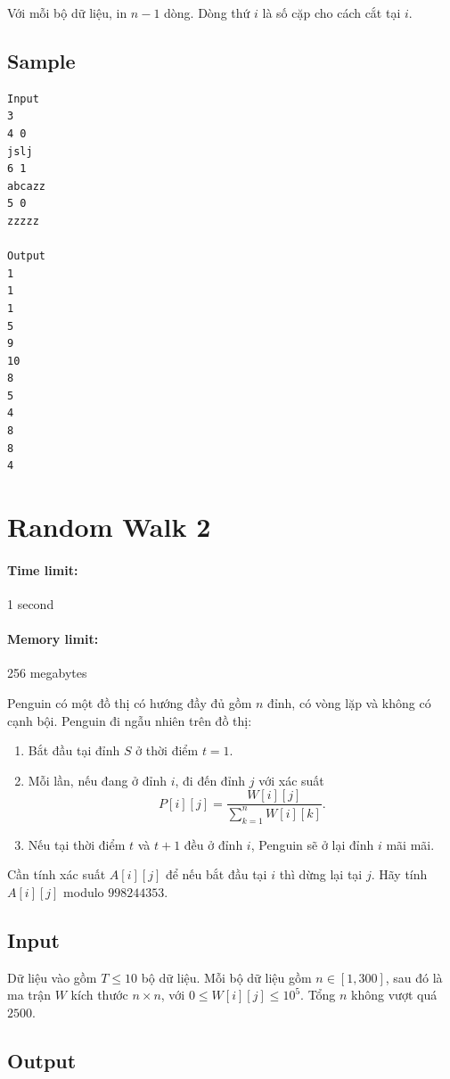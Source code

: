 \documentclass[11pt]{article}
\begin{document}
Với mỗi bộ dữ liệu, in \(n-1\) dòng. Dòng thứ \(i\) là số cặp cho cách cắt tại
\(i\).

\subsection*{Sample}

\begin{verbatim}
Input
3
4 0
jslj
6 1
abcazz
5 0
zzzzz

Output
1
1
1
5
9
10
8
5
4
8
8
4
\end{verbatim}

\section{Random Walk 2}

\paragraph{Time limit:} 1 second
\paragraph{Memory limit:} 256 megabytes

Penguin có một đồ thị có hướng đầy đủ gồm \(n\) đỉnh, có vòng lặp và không có
cạnh bội. Penguin đi ngẫu nhiên trên đồ thị:
\begin{enumerate}
  \item Bắt đầu tại đỉnh \(S\) ở thời điểm \(t=1\).
  \item Mỗi lần, nếu đang ở đỉnh \(i\), đi đến đỉnh \(j\) với xác suất
  \[
    P[i][j]=\frac{W[i][j]}{\sum_{k=1}^n W[i][k]}.
  \]
  \item Nếu tại thời điểm \(t\) và \(t+1\) đều ở đỉnh \(i\), Penguin sẽ ở lại
        đỉnh \(i\) mãi mãi.
\end{enumerate}
Cần tính xác suất \(A[i][j]\) để nếu bắt đầu tại \(i\) thì dừng lại tại \(j\).
Hãy tính \(A[i][j]\) modulo \(998244353\).

\subsection*{Input}

Dữ liệu vào gồm \(T\le 10\) bộ dữ liệu. Mỗi bộ dữ liệu gồm \(n\in[1,300]\), sau đó
là ma trận \(W\) kích thước \(n\times n\), với \(0\le W[i][j]\le 10^5\). Tổng
\(n\) không vượt quá \(2500\).

\subsection*{Output}
\end{document}
